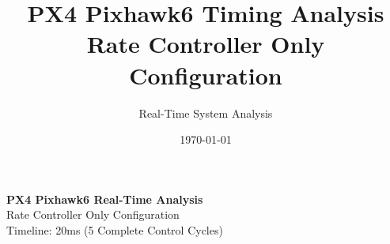 \documentclass[landscape,a4paper]{article}
\title{\Huge\textbf{PX4 Pixhawk6 Timing Analysis}\\\Large Rate Controller Only Configuration}
\author{Real-Time System Analysis}
\date{\today}
\begin{document}
\maketitle

\begin{center}
\begin{tcolorbox}[colback=px4blue!10,colframe=px4darkblue,width=\textwidth,arc=3mm,boxrule=2pt]
\centering
{\Huge\color{px4darkblue}\textbf{PX4 Pixhawk6 Real-Time Analysis}}\\[0.5cm]
{\Large\color{px4blue}Rate Controller Only Configuration}\\[0.3cm]
{\large Timeline: 20ms (5 Complete Control Cycles)}
\end{tcolorbox}
\end{center}

\vspace{0.5cm}
\end{document}
